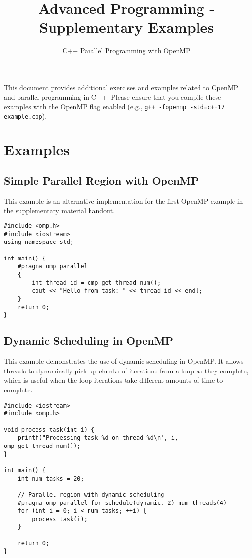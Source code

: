 \documentclass{article}
\title{Advanced Programming - Supplementary Examples}
\author{C++ Parallel Programming with OpenMP}
\date{}
\begin{document}
\maketitle

This document provides additional exercises and examples related to OpenMP and parallel programming in C++. Please ensure that you compile these examples with the OpenMP flag enabled (e.g., \texttt{g++ -fopenmp -std=c++17 example.cpp}).

\section*{Examples}

\subsection*{Simple Parallel Region with OpenMP}
This example is an alternative implementation for the first OpenMP example in the supplementary material handout.

\begin{verbatim}
#include <omp.h>
#include <iostream>
using namespace std;

int main() {
    #pragma omp parallel
    {
        int thread_id = omp_get_thread_num();
        cout << "Hello from task: " << thread_id << endl;
    }
    return 0;
}
\end{verbatim}

\subsection*{Dynamic Scheduling in OpenMP}
This example demonstrates the use of dynamic scheduling in OpenMP. It allows threads to dynamically pick up chunks of iterations from a loop as they complete, which is useful when the loop iterations take different amounts of time to complete.

\begin{verbatim}
#include <iostream>
#include <omp.h>

void process_task(int i) {
    printf("Processing task %d on thread %d\n", i, omp_get_thread_num());
}

int main() {
    int num_tasks = 20;
    
    // Parallel region with dynamic scheduling
    #pragma omp parallel for schedule(dynamic, 2) num_threads(4)
    for (int i = 0; i < num_tasks; ++i) {
        process_task(i);
    }

    return 0;
}
\end{verbatim}
\end{document}
